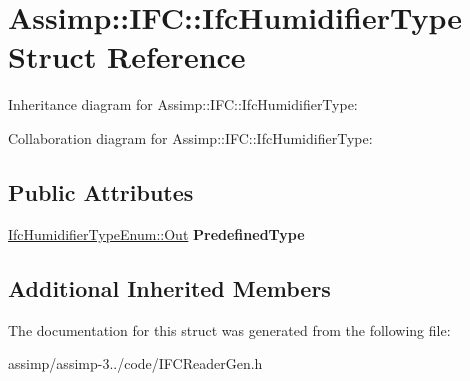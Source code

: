 \hypertarget{struct_assimp_1_1_i_f_c_1_1_ifc_humidifier_type}{\section{Assimp\+:\+:I\+F\+C\+:\+:Ifc\+Humidifier\+Type Struct Reference}
\label{struct_assimp_1_1_i_f_c_1_1_ifc_humidifier_type}
}


Inheritance diagram for Assimp\+:\+:I\+F\+C\+:\+:Ifc\+Humidifier\+Type\+:


Collaboration diagram for Assimp\+:\+:I\+F\+C\+:\+:Ifc\+Humidifier\+Type\+:
\subsection*{Public Attributes}
\begin{DoxyCompactItemize}
\item 
\hypertarget{struct_assimp_1_1_i_f_c_1_1_ifc_humidifier_type_a13feb977573c86b4fa4d3abdd0bf610b}{\hyperlink{classboost_1_1shared__ptr}{Ifc\+Humidifier\+Type\+Enum\+::\+Out} {\bfseries Predefined\+Type}}\label{struct_assimp_1_1_i_f_c_1_1_ifc_humidifier_type_a13feb977573c86b4fa4d3abdd0bf610b}

\end{DoxyCompactItemize}
\subsection*{Additional Inherited Members}


The documentation for this struct was generated from the following file\+:\begin{DoxyCompactItemize}
\item 
assimp/assimp-\/3../code/I\+F\+C\+Reader\+Gen.\+h\end{DoxyCompactItemize}
